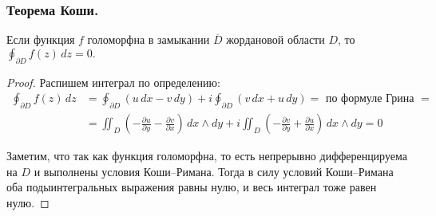 \subsubsection{Теорема Коши.}
\begin{theorem*}
	Если функция $f$ голоморфна в замыкании $\overline{D}$ жордановой области $D$, то $\oint_{\partial D} f(z)\,dz = 0.$
\end{theorem*}
\begin{proof}
	Распишем интеграл по определению:
	\begin{align*}
		\oint_{\partial D} f(z)\,dz &= 	\oint_{\partial D} (u\,dx - v\,dy) + i 	\oint_{\partial D} (v\,dx + u\, dy) = \text{ по формуле Грина } = \\		
		&= \iint_{D} \left(-\frac{\partial u}{\partial y} - \frac{\partial v}{\partial x}\right)\, dx \wedge dy + i \iint_{D} \left(-\frac{\partial v}{\partial y} + \frac{\partial u}{\partial x}\right)\, dx \wedge dy  = 0
	\end{align*}

	Заметим, что так как функция голоморфна, то есть непрерывно дифференцируема на $D$ и выполнены условия Коши--Римана. Тогда в силу условий Коши--Римана оба подыинтегральных выражения равны нулю, и весь интеграл тоже равен нулю.
\end{proof}	

